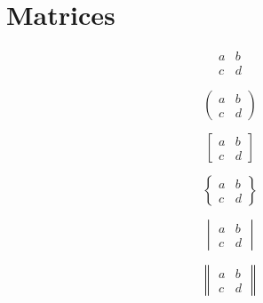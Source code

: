 \documentclass[17pt]{extarticle}
\begin{document}
\section{Matrices}
\[
\begin{matrix}
    a & b \\
    c & d
\end{matrix}
\]

\[
\begin{pmatrix}
    a & b \\
    c & d
\end{pmatrix}
\]

\[
\begin{bmatrix}
    a & b \\
    c & d
\end{bmatrix}
\]

\[
\begin{Bmatrix}
    a & b \\
    c & d
\end{Bmatrix}
\]

\[
\begin{vmatrix}
    a & b \\
    c & d
\end{vmatrix}
\]

\[
\begin{Vmatrix}
    a & b \\
    c & d
\end{Vmatrix}
\]
\end{document}
